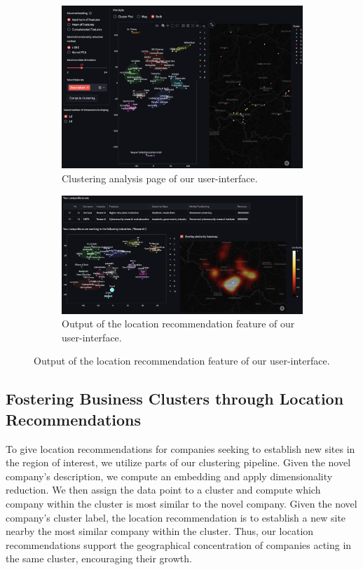 \documentclass[12pt]{article}
\begin{document}
   \begin{figure}[H]
   	\centering
   	\begin{subfigure}[b]{0.48\textwidth}
   		\centering
   		\includegraphics[width=\textwidth]{figures/clustering_analysis.png}
   		\caption{Clustering analysis page of our user-interface.}
   		\label{fig:clustering-analysis}
   	\end{subfigure}
   	\hfil
   	\begin{subfigure}[b]{0.48\textwidth}
   		\centering
   		\includegraphics[width=\textwidth]{figures/location_recommendation_output.png}
   		\caption{Output of the location recommendation feature of our user-interface.}
   		\label{fig:location-recommendation-output}
   	\end{subfigure}
   \end{figure}
   
   \subsection*{Fostering Business Clusters through Location Recommendations}
   To give location recommendations for companies seeking to establish new sites in the region of interest, we utilize parts of our clustering pipeline. Given the novel company's description, we compute an embedding and apply dimensionality reduction. We then assign the data point to a cluster and compute which company within the cluster is most similar to the novel company.
   Given the novel company's cluster label, the location recommendation is to establish a new site nearby the most similar company within the cluster. Thus, our location recommendations support the geographical concentration of companies acting in the same cluster, encouraging their growth.
   
\end{document}

